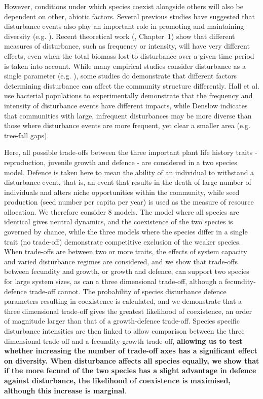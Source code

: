 \documentclass[preprint,10pt,reqno]{report}
\begin{document}
However, conditions under which species coexist alongside others will also be dependent on other, abiotic factors. Several previous studies have suggested that disturbance events also play an important role in promoting and maintaining diversity (e.g. \cite{sousa1984role,denslow1987tropical}).  Recent theoretical work (\cite{miller2011frequency,nattrass2012quantifying}, Chapter~1) show that different measures of disturbance, such as frequency or intensity, will have very different effects, even when the total biomass lost to disturbance over a given time period is taken into account. While many empirical studies consider disturbance as a single parameter (e.g. \cite{molino2001tree,peterson1997tornado,nakagawa2000impact}), some studies do demonstrate that different factors determining disturbance can affect the community structure differently. Hall et al. \cite{hall2012diversity} use bacterial populations to experimentally demonstrate that the frequency and intensity of disturbance events have different impacts, while Denslow \cite{denslow1980patterns} indicates that communities with large, infrequent disturbances may be more diverse than those where disturbance events are more frequent, yet clear a smaller area (e.g. tree-fall gaps). 

Here, all possible trade-offs between the three important plant life history traits - reproduction, juvenile growth and defence - are considered in a two species model. Defence is taken here to mean the ability of an individual to withstand a disturbance event, that is, an event that results in the death of large number of individuals and alters niche opportunities within the community, while seed production (seed number per capita per year) is used as the measure of resource allocation. We therefore consider 8 models. The model where all species are identical gives neutral dynamics, and the coexistence of the two species is governed by chance, while the three models where the species differ in a single trait (no trade-off) demonstrate competitive exclusion of the weaker species. When trade-offs are between two or more traits, the effects of system capacity and varied disturbance regimes  are considered, and we show that trade-offs between fecundity and growth, or growth and defence, can support two species for large system sizes, as can a three dimensional trade-off, although a fecundity-defence trade-off cannot. The probability of species disturbance defence parameters resulting in coexistence is calculated, and we demonstrate that a three dimensional trade-off gives the greatest likelihood of coexistence, an order of magnitude larger than that of a growth-defence trade-off. Species specific disturbance intensities are then linked to allow comparison between the three dimensional trade-off and a fecundity-growth trade-off, \textbf{allowing us to test whether increasing the number of trade-off axes has a significant effect on diversity. When disturbance affects all species equally, we show that if the more fecund of the two species has a slight advantage in defence against disturbance, the likelihood of coexistence is maximised, although this increase is marginal}.
\end{document}
